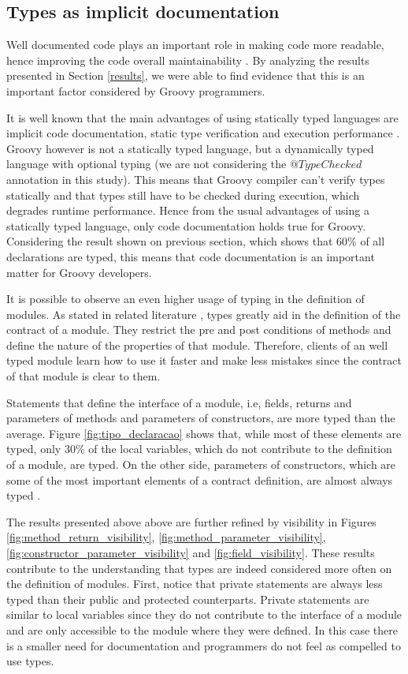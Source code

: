 \documentclass[preprint]{sigplanconf}
\begin{document}
\subsection{Types as implicit documentation\label{discussion-q1}}
Well documented code plays an important role in making code more readable, hence improving the code overall maintainability \cite{Iso2004}.
By analyzing the results presented in Section \ref{results}, we were able to find evidence that this is an important factor considered by Groovy programmers.

It is well known that the main advantages of using statically typed languages are implicit code documentation, static type verification and execution performance \cite{type_systems,mayer2012static}.
Groovy however is not a statically typed language, but a dynamically typed language with optional typing (we are not considering the $@TypeChecked$ annotation in this study).
This means that Groovy compiler can't verify types statically and that types still have to be checked during execution, which degrades runtime performance.
Hence from the usual advantages of using a statically typed language, only code documentation holds true for Groovy.
Considering the result shown on previous section, which shows that 60\% of all declarations are typed, this means that code documentation is an important matter for Groovy developers.

It is possible to observe an even higher usage of typing in the definition of modules.
As stated in related literature \cite{Meyer88, Meijer04, Wadler04, Plosch97, Flanagan2006, Furr09}, types greatly aid in the definition of the contract of a module.
They restrict the pre and post conditions of methods and define the nature of the properties of that module.
Therefore, clients of an well typed module learn how to use it faster and make less mistakes since the contract of that module is clear to them.

Statements that define the interface of a module, i.e, fields, returns and parameters of methods and parameters of constructors, are more typed than the average.
Figure \ref{fig:tipo_declaracao} shows that, while most of these elements are typed, only 30\%  of the local variables, which do not contribute to the definition of a module, are typed. On the other side, parameters of constructors, which are some of the most important elements of a contract definition, are almost always typed \cite{Meijer04}. 

The results presented above above are further refined by visibility in Figures \ref{fig:method_return_visibility}, \ref{fig:method_parameter_visibility}, \ref{fig:constructor_parameter_visibility} and \ref{fig:field_visibility}.
These results contribute to the understanding that types are indeed considered more often on the definition of modules.
First, notice that private statements are always less typed than their public and protected counterparts.
Private statements are similar to local variables since they do not contribute to the interface of a module and are only accessible to the module where they were defined.
In this case there is a smaller need for documentation and programmers do not feel as compelled to use types.
\end{document}

